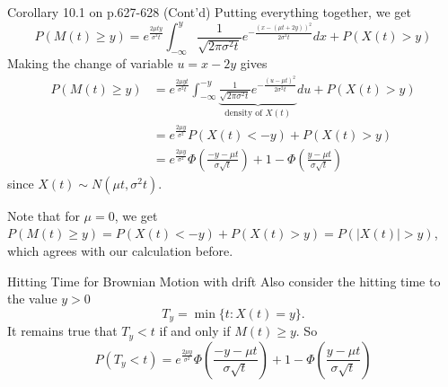 \documentclass[letterpaper,handout]{beamer}
\def\E{\mathbb E}
\begin{document}
\begin{frame}{Corollary 10.1 on p.627-628 (Cont'd)}
Putting everything together, we get
\[
P(M(t) \ge y)
=e^{\frac{2\mu ty}{\sigma^2t}}\int_{-\infty}^y\frac{1}{\sqrt{2\pi\sigma^2t}}e^{-\frac{(x-(\mu t+2y))^2}{2\sigma^2t}}dx
+P(X(t)>y)
\]
Making the change of variable $u = x-2y$ gives
\begin{align*}
P(M(t) \ge y)
&=e^{\frac{2\mu yt}{\sigma^2t}}\int_{-\infty}^{-y}
\underbrace{\frac{1}{\sqrt{2\pi\sigma^2t}}e^{-\frac{(u-\mu t)^2}{2\sigma^2t}}}_{\text{density of }X(t)}du
+P(X(t)>y)\\
&=e^{\frac{2\mu y}{\sigma^2}}P(X(t)<-y)+P(X(t)>y)\\
&=e^{\frac{2\mu y}{\sigma^2}}\Phi\left(\frac{-y-\mu t}{\sigma\sqrt{t}}\right)+1-\Phi\left(\frac{y-\mu t}{\sigma\sqrt{t}}\right)
\end{align*}
since $X(t)\sim N(\mu t, \sigma^2 t).$\medskip

Note that for $\mu=0$, we get $P(M(t) \ge y)=P(X(t)<-y)+P(X(t)>y)=P(|X(t)|>y)$, which agrees with our calculation before.
\end{frame}
\begin{frame}{Hitting Time for Brownian Motion with drift}
Also consider the hitting time to the value $y>0$
\[
T_y=\min\{t: X(t)=y\}.
\]
It remains true that $T_y<t$ if and only if $M(t)\ge y.$ So
\[
P(T_y<t)=
e^{\frac{2\mu y}{\sigma^2}}\Phi\left(\frac{-y-\mu t}{\sigma\sqrt{t}}\right)+1-\Phi\left(\frac{y-\mu t}{\sigma\sqrt{t}}\right)
\]
\end{frame}
\end{document}
